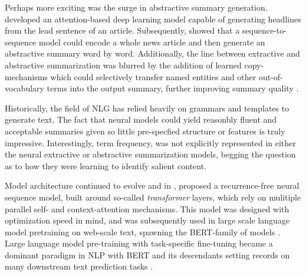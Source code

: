 
Perhaps more exciting was the surge in abstractive summary generation.
\cite{rush2015} developed an attention-based deep learning  model capable of
generating headlines from the lead sentence of an article. Subsequently,
\citet{nallapati2016} showed that a sequence-to-sequence model could encode a
whole news article and then generate an abstractive summary word by word. 
Additionally, the
line between extractive and abstractive summarization was blurred by the
addition of learned copy-mechanisms which could selectively transfer named
entities and other out-of-vocabulary terms into the output summary, further
improving summary quality \citep{see2017}.  

Historically, the field of NLG has relied heavily on grammars and templates to
generate text. The fact that neural models could yield reasonbly fluent and
acceptable summaries given so little pre-specfied structure or features is
truly impressive.  Interestingly, term frequency, was not explicitly
represented in either the neural extractive or abstractive summarization
models, begging the question as to how they were learning to identify salient
content.

Model architecture continued to evolve and in \citeyear{vaswani2017}, \citeauthor{vaswani2017}
  proposed a recurrence-free neural sequence model, built around so-called 
  \textit{transformer} layers,
  which rely on mulitiple parallel self- and context-attention mechanisms.
  This model was designed with optimization speed in mind, and was subsequently
  used in large scale language model pretraining on web-scale text, 
  spawning the BERT-family
  of models \citep{devlin2019}. Large language model pre-training with task-specific
fine-tuning became a dominant 
paradigm in NLP with BERT and its descendants setting records on many 
downstream text prediction tasks \citep{ruder2019}.

  
